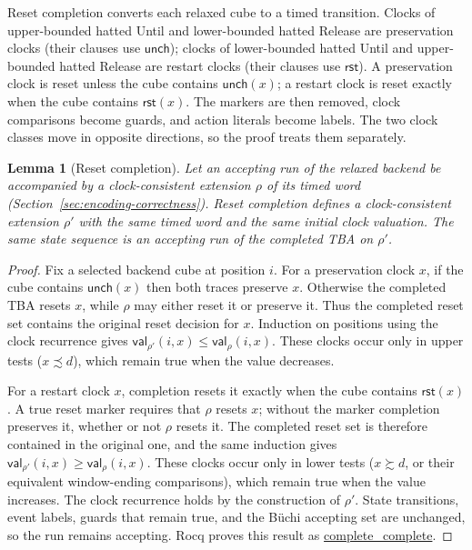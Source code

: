 \documentclass{ieeeaccess}
\newtheorem{lemma}[theorem]{Lemma}
\newcommand{\Reset}{\mathsf{rst}}
\newcommand{\Unch}{\mathsf{unch}}
\newcommand{\CVal}{\mathsf{val}}
\newcommand{\Rocqid}[1]{\url{#1}}
\begin{document}
Reset completion converts each relaxed cube to a timed transition. Clocks of
upper-bounded hatted Until and lower-bounded hatted Release are preservation
clocks (their clauses use $\Unch$); clocks of lower-bounded hatted Until and
upper-bounded hatted Release are restart clocks (their clauses use $\Reset$). A
preservation clock is reset unless the cube contains $\Unch(x)$; a restart
clock is reset exactly when the cube contains $\Reset(x)$. The markers are
then removed, clock comparisons become guards, and action literals become
labels. The two clock classes move in opposite directions, so the proof
treats them separately.

\begin{lemma}[Reset completion]
\label{lem:reset-completion}
Let an accepting run of the relaxed backend be accompanied by a
clock-consistent extension $\rho$ of its timed word
(Section~\ref{sec:encoding-correctness}). Reset completion
defines a clock-consistent extension $\rho'$ with the same timed word and
the same initial clock valuation. The same state sequence is an accepting
run of the completed TBA on $\rho'$.
\end{lemma}
\begin{proof}
Fix a selected backend cube at position $i$. For a preservation clock $x$,
if the cube contains $\Unch(x)$ then both traces preserve $x$. Otherwise the
completed TBA resets $x$, while $\rho$ may either reset it or preserve it.
Thus the completed reset set contains the original reset decision for $x$.
Induction on positions using the clock recurrence gives
$\CVal_{\rho'}(i,x)\le\CVal_\rho(i,x)$. These clocks occur only in upper
tests ($x\precsim d$), which remain true when the value decreases.

For a restart clock $x$, completion resets it exactly when the cube contains
$\Reset(x)$. A true reset marker requires that $\rho$ resets $x$; without the
marker completion preserves it, whether or not $\rho$ resets it. The
completed reset set is therefore contained in the original one, and the same
induction gives $\CVal_{\rho'}(i,x)\ge\CVal_\rho(i,x)$. These clocks occur
only in lower tests ($x\succsim d$, or their equivalent window-ending
comparisons), which remain true when the value increases. The clock recurrence
holds by the construction of $\rho'$. State transitions, event labels,
guards that remain true, and the B\"uchi accepting set are unchanged, so the
run remains accepting. Rocq proves this result as
\Rocqid{complete_complete}.
\end{proof}
\end{document}
